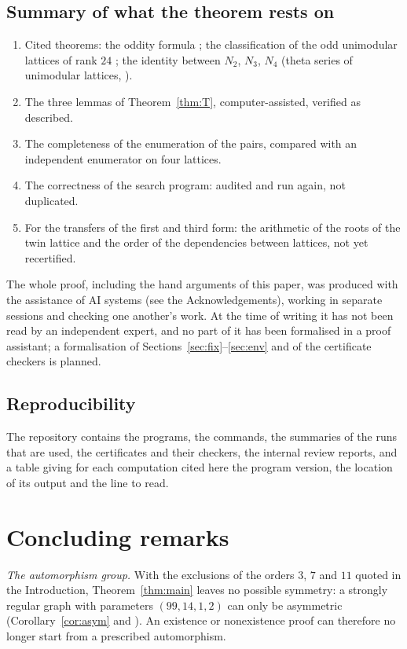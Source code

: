 \documentclass[11pt]{amsart}
\theoremstyle{definition}
\theoremstyle{remark}
\begin{document}
\subsection*{Summary of what the theorem rests on}
\begin{enumerate}[leftmargin=2em]
\item Cited theorems: the oddity formula \cite{SPLAG}; the classification of the odd unimodular lattices of rank $24$
\cite{Bor}; the identity between $N_2$, $N_3$, $N_4$ (theta series of unimodular lattices, \cite{SPLAG}).
\item The three lemmas of Theorem~\ref{thm:T}, computer-assisted, verified as described.
\item The completeness of the enumeration of the pairs, compared with an independent enumerator on four lattices.
\item The correctness of the search program: audited and run again, not duplicated.
\item For the transfers of the first and third form: the arithmetic of the roots of the twin lattice and the order of the
dependencies between lattices, not yet recertified.
\end{enumerate}
The whole proof, including the hand arguments of this paper, was produced with the assistance of AI systems (see the
Acknowledgements), working in separate sessions and checking one another's work. At the time of writing it has not been read
by an independent expert, and no part of it has been formalised in a proof assistant; a formalisation of
Sections~\ref{sec:fix}--\ref{sec:env} and of the certificate checkers is planned.

\subsection*{Reproducibility} The repository \cite{repo} contains the programs, the commands, the summaries of the runs that are used, the certificates and their checkers, the internal review reports, and a table giving for each computation cited here the program
version, the location of its output and the line to read.

\section{Concluding remarks}

\emph{The automorphism group.} With the exclusions of the orders $3$, $7$ and $11$ quoted in the Introduction,
Theorem~\ref{thm:main} leaves no possible symmetry: a strongly regular graph with parameters $(99,14,1,2)$ can only be
asymmetric (Corollary~\ref{cor:asym} and \cite{Note}). An existence or nonexistence proof can therefore no longer start
from a prescribed automorphism.
\end{document}
